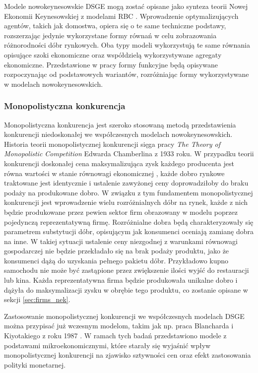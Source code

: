 Modele nowokeynesowskie DSGE mogą zostać opisane jako synteza teorii Nowej Ekonomii Keynesowskiej z modelami RBC \cite{gali_gertler}. Wprowadzenie optymalizujących agentów, takich jak domostwa, opiera się o te same techniczne podstawy, rozszerzając jedynie wykorzystane formy równań w celu zobrazowania różnorodności dóbr rynkowych. Oba typy modeli wykorzystują te same równania opisujące szoki ekonomiczne oraz współdzielą wykorzystywane agregaty ekonomiczne. Przedstawione w pracy formy funkcyjne będą opisywane rozpoczynając od podstawowych wariantów, rozróżniając formy wykorzystywane w modelach nowokeynesowskich.

\subsubsection{Monopolistyczna konkurencja}
\label{sec:monopol_comp}

Monopolistyczna konkurencja jest szeroko stosowaną metodą przedstawienia konkurencji niedoskonałej we współczesnych modelach nowokeynesowskich. Historia teorii monopolistycznej konkurencji sięga pracy \emph{The Theory of Monopolistic Competition} Edwarda Chamberlina z 1933 roku. W przypadku teorii konkurencji doskonałej cena maksymalizująca zysk każdego producenta jest równa wartości w stanie równowagi ekonomicznej \cite{mono_comp_theory}, każde dobro rynkowe traktowane jest identycznie i ustalenie zawyżonej ceny doprowadziłoby do braku podaży na produkowane dobro. W związku z tym fundamentem monopolistycznej konkurencji jest wprowadzenie wielu rozróżnialnych dóbr na rynek, każde z nich będzie produkowane przez pewien sektor firm obrazowany w modelu poprzez pojedynczą reprezentatywną firmę. Rozróżnialne dobra będą charakteryzowały się parametrem substytucji dóbr, opisującym jak konsumenci oceniają zamianę dobra na inne. W takiej sytuacji ustalenie ceny niezgodnej z warunkami równowagi gospodarczej nie będzie przekładało się na brak podaży produktu, jako że konsumenci dążą do uzyskania pełnego pakietu dóbr. Przykładowo kupno samochodu nie może być zastąpione przez zwiększenie ilości wyjść do restauracji lub kina. Każda reprezentatywna firma będzie produkowała unikalne dobro i dążyła do maksymalizacji zysku w obrębie tego produktu, co zostanie opisane w sekcji \ref{sec:firms_nek}.

Zastosowanie monopolistycznej konkurencji we współczesnych modelach DSGE można przypisać już wczesnym modelom, takim jak np. praca Blancharda i Kiyotakiego z roku 1987  \cite{blanchard_mono_comp}. W ramach tych badań przedstawiono modele z podstawami mikroekonomicznymi, które starały się wyjaśnić wpływ monopolistycznej konkurencji na zjawisko sztywności cen oraz efekt zastosowania polityki monetarnej. 


